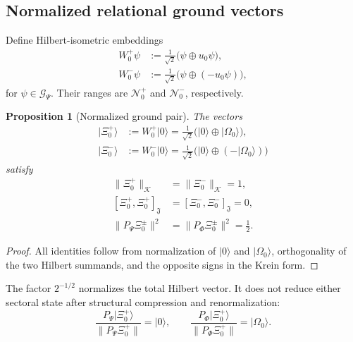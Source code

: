 \documentclass[11pt,reqno]{scrartcl}
\newcommand{\scrK}{\mathscr K}
\newcommand{\fundJ}{\mathfrak J}
\newcommand{\PP}{P_{\Psi}}
\newcommand{\PF}{P_{\Phi}}
\newcommand{\GzeroP}{\mathscr G_{\Psi}}
\newcommand{\uzero}{u_{0}}
\newcommand{\NzeroPlus}{\mathscr N_{0}^{+}}
\newcommand{\NzeroMinus}{\mathscr N_{0}^{-}}
\newcommand{\WzeroPlus}{W_{0}^{+}}
\newcommand{\WzeroMinus}{W_{0}^{-}}
\newcommand{\ket}[1]{\lvert #1\rangle}
\newcommand{\kInner}[2]{[#1,#2]_{\fundJ}}
\theoremstyle{plain}
\newtheorem{proposition}[proposition]{Proposition}
\theoremstyle{definition}
\theoremstyle{remark}
\begin{document}
\subsection{Normalized relational ground vectors}

Define Hilbert-isometric embeddings
\begin{align}
  \WzeroPlus\psi
  &:=\frac{1}{\sqrt2}\bigl(\psi\oplus\uzero\psi\bigr),
  \label{eq:W0-plus-definition}\\
  \WzeroMinus\psi
  &:=\frac{1}{\sqrt2}\bigl(\psi\oplus(-\uzero\psi)\bigr),
  \label{eq:W0-minus-definition}
\end{align}
for \(\psi\in\GzeroP\).  Their ranges are \(\NzeroPlus\) and
\(\NzeroMinus\), respectively.

\begin{proposition}[Normalized ground pair]
\label{prop:normalized-ground-pair}
The vectors
\begin{align}
  \ket{\Xi_0^+}
  &:=\WzeroPlus\ket0
   =\frac1{\sqrt2}\bigl(\ket0\oplus\ket{\Omega_0}\bigr),
  \label{eq:Xi0-plus}\\
  \ket{\Xi_0^-}
  &:=\WzeroMinus\ket0
   =\frac1{\sqrt2}\bigl(\ket0\oplus(-\ket{\Omega_0})\bigr)
  \label{eq:Xi0-minus}
\end{align}
satisfy
\begin{align}
  \|\Xi_0^+\|_{\scrK}
  &=\|\Xi_0^-\|_{\scrK}=1,
  \label{eq:Xi-Hilbert-normalization}\\
  \kInner{\Xi_0^+}{\Xi_0^+}
  &=\kInner{\Xi_0^-}{\Xi_0^-}=0,
  \label{eq:Xi-Krein-null}\\
  \|\PP\Xi_0^{\pm}\|^2
  &=\|\PF\Xi_0^{\pm}\|^2=\frac12.
  \label{eq:Xi-equal-sector-weights}
\end{align}
\end{proposition}

\begin{proof}
All identities follow from normalization of \(\ket0\) and
\(\ket{\Omega_0}\), orthogonality of the two Hilbert summands, and the
opposite signs in the Krein form.
\end{proof}

The factor \(2^{-1/2}\) normalizes the total Hilbert vector.  It does not
reduce either sectoral state after structural compression and
renormalization:
\begin{equation}
  \frac{\PP\ket{\Xi_0^+}}{\|\PP\Xi_0^+\|}=\ket0,
  \qquad
  \frac{\PF\ket{\Xi_0^+}}{\|\PF\Xi_0^+\|}=\ket{\Omega_0}.
  \label{eq:Xi-conditional-sector-states}
\end{equation}
\end{document}
